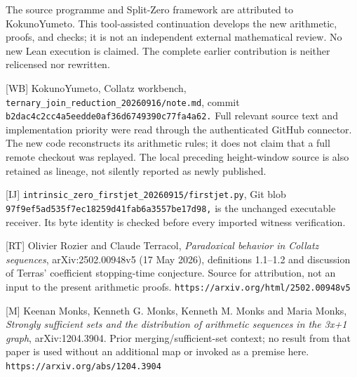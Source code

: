 The source programme and Split-Zero framework are attributed to
KokunoYumeto. This tool-assisted continuation develops the new
arithmetic, proofs, and checks; it is not an independent external
mathematical review. No new Lean execution is claimed. The complete
earlier contribution is neither relicensed nor rewritten.

{[}WB{]} KokunoYumeto, Collatz workbench,
\nolinkurl{ternary_join_reduction_20260916/note.md}, commit
\nolinkurl{b2dac4c2cc4a5eedde0af36d6749390c77fa4a62.} Full relevant
source text and implementation priority were read through the
authenticated GitHub connector. The new code reconstructs its arithmetic
rules; it does not claim that a full remote checkout was replayed. The
local preceding height-window source is also retained as lineage, not
silently reported as newly published.

{[}IJ{]} \nolinkurl{intrinsic_zero_firstjet_20260915/firstjet.py}, Git
blob \nolinkurl{97f9ef5ad535f7ec18259d41fab6a3557be17d98,} is the
unchanged executable receiver. Its byte identity is checked before every
imported witness verification.

{[}RT{]} Olivier Rozier and Claude Terracol, \emph{Paradoxical behavior
in Collatz sequences}, arXiv:2502.00948v5 (17 May 2026), definitions
1.1--1.2 and discussion of Terras' coefficient stopping-time conjecture.
Source for attribution, not an input to the present arithmetic proofs.
\nolinkurl{https://arxiv.org/html/2502.00948v5}

{[}M{]} Keenan Monks, Kenneth G. Monks, Kenneth M. Monks and Maria
Monks, \emph{Strongly sufficient sets and the distribution of arithmetic
sequences in the 3x+1 graph}, arXiv:1204.3904. Prior
merging/sufficient-set context; no result from that paper is used
without an additional map or invoked as a premise here.
\nolinkurl{https://arxiv.org/abs/1204.3904}
